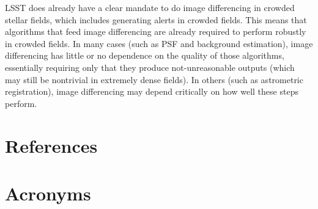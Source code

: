 \documentclass[DM,authoryear,toc]{lsstdoc}
\begin{document}
LSST does already have a clear mandate to do image differencing in crowded stellar fields, which includes generating alerts in crowded fields.
This means that algorithms that feed image differencing are already required to perform robustly in crowded fields.
In many cases (such as PSF and background estimation), image differencing has little or no dependence on the quality of those algorithms, essentially requiring only that they produce not-unreasonable outputs (which may still be nontrivial in extremely dense fields).
In others (such as astrometric registration), image differencing may depend critically on how well these steps perform.


\section{References} \label{sec:bib}


\section{Acronyms} \label{sec:acronyms}

\end{document}
